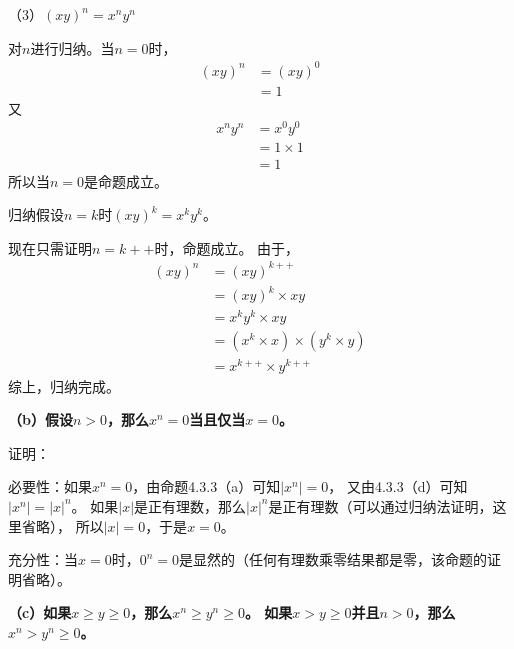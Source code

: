 \documentclass{article}
\theoremstyle{mystyle}
\begin{document}
（3）$(xy)^n = x^n y^n$

对$n$进行归纳。当$n=0$时，
\begin{align*}
  (xy)^n & = (xy)^0 \\
         & = 1
\end{align*}
又
\begin{align*}
  x^n y^n & = x^0 y^0    \\
          & = 1 \times 1 \\
          & = 1
\end{align*}
所以当$n=0$是命题成立。

归纳假设$n=k$时$(xy)^k = x^k y^k$。

现在只需证明$n=k++$时，命题成立。
由于，
\begin{align*}
  (xy)^n & =(xy)^{k++}                            \\
         & = (xy)^k \times xy                     \\
         & = x^k y^k \times xy                    \\
         & = (x^k \times x) \times (y^k \times y) \\
         & = x^{k++} \times y^{k++}
\end{align*}
综上，归纳完成。

\textbf{（b）假设$n>0$，那么$x^n = 0$当且仅当$x=0$。}

证明：

必要性：如果$x^n=0$，由命题4.3.3（a）可知$|x^n|=0$，
又由4.3.3（d）可知$|x^n|=|x|^n$。
如果$|x|$是正有理数，那么$|x|^n$是正有理数（可以通过归纳法证明，这里省略），
所以$|x|=0$，于是$x=0$。

充分性：当$x=0$时，$0^n=0$是显然的（任何有理数乘零结果都是零，该命题的证明省略）。

\textbf{（c）如果$x \geq y \geq 0$，那么$x^n \geq y^n \geq 0$。
  如果$x > y \geq 0$并且$n > 0$，那么$x^n > y^n \geq 0$。}
\end{document}
